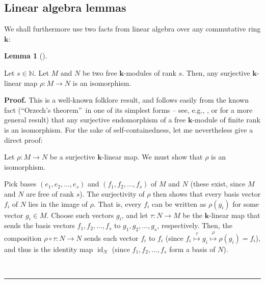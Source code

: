 \documentclass[numbers=enddot,12pt,final,onecolumn,notitlepage]{scrartcl}%
\theoremstyle{definition}
\newtheorem{lem}[theo]{Lemma}
\newenvironment{lemma}[1][]
{\begin{lem}[#1]\begin{leftbar}}
{\end{leftbar}\end{lem}}
\newenvironment{proof}[1][Proof]{\noindent\textbf{#1.} }{\ \rule{0.5em}{0.5em}}
\begin{document}
\subsection{Linear algebra lemmas}

We shall furthermore use two facts from linear algebra over any commutative
ring $\mathbf{k}$:

\begin{lemma}
\label{lem.surj=bij}Let $s\in\mathbb{N}$. Let $M$ and $N$ be two free
$\mathbf{k}$-modules of rank $s$. Then, any surjective $\mathbf{k}$-linear map
$\rho:M\rightarrow N$ is an isomorphism.
\end{lemma}

\begin{proof}
This is a well-known folklore result, and follows easily from the known fact
(\textquotedblleft Orzech's theorem\textquotedblright\ in one of its simplest
forms -- see, e.g., \cite[Exercise 2.5.18 (a)]{GriRei}, or \cite[Corollary
0.2]{Grinberg-Orzech} for a more general result) that any surjective
endomorphism of a free $\mathbf{k}$-module of finite rank is an isomorphism.
For the sake of self-containedness, let me nevertheless give a direct proof:

Let $\rho:M\rightarrow N$ be a surjective $\mathbf{k}$-linear map. We must
show that $\rho$ is an isomorphism.

Pick bases $\left(  e_{1},e_{2},\ldots,e_{s}\right)  $ and $\left(
f_{1},f_{2},\ldots,f_{s}\right)  $ of $M$ and $N$ (these exist, since $M$ and
$N$ are free of rank $s$). The surjectivity of $\rho$ then shows that every
basis vector $f_{i}$ of $N$ lies in the image of $\rho$. That is, every
$f_{i}$ can be written as $\rho\left(  g_{i}\right)  $ for some vector
$g_{i}\in M$. Choose such vectors $g_{i}$, and let $\tau:N\rightarrow M$ be
the $\mathbf{k}$-linear map that sends the basis vectors $f_{1},f_{2}%
,\ldots,f_{s}$ to $g_{1},g_{2},\ldots,g_{s}$, respectively. Then, the
composition $\rho\circ\tau:N\rightarrow N$ sends each vector $f_{i}$ to
$f_{i}$ (since $f_{i}\overset{\tau}{\mapsto}g_{i}\overset{\rho}{\mapsto}%
\rho\left(  g_{i}\right)  =f_{i}$), and thus is the identity map
$\operatorname*{id}\nolimits_{N}$ (since $f_{1},f_{2},\ldots,f_{s}$ form a
basis of $N$).


\end{proof}
\end{document}

